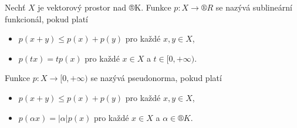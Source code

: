 \documentclass[12pt]{article}					%
\begin{document}

\begin{definice}
	Nechť $X$ je vektorový prostor nad ®K. Funkce $p: X \rightarrow ®R$ se nazývá sublineární funkcionál, pokud platí
	\begin{itemize}
		\item $p(x + y) ≤ p(x) + p(y)$ pro každé $x, y \in X$,
		\item $p(t x) = t p(x)$ pro každé $x \in X$ a $t \in [0, +∞)$.
	\end{itemize}

	Funkce $p: X → [0, +∞)$ se nazývá pseudonorma, pokud platí
	\begin{itemize}
		\item $p(x + y) ≤ p(x) + p(y)$ pro každé $x, y \in X$,
		\item $p(\alpha x) = |\alpha|p(x)$ pro každé $x \in X$ a $\alpha \in ®K$.
	\end{itemize}
\end{definice}
\end{document}
